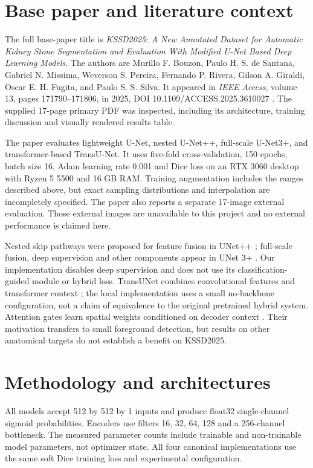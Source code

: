 \documentclass[a4paper,fleqn]{cas-sc}
\begin{document}
\section{Base paper and literature context}
The full base-paper title is \emph{KSSD2025: A New Annotated Dataset for Automatic Kidney Stone Segmentation and Evaluation With Modified U-Net Based Deep Learning Models}. The authors are Murillo F. Bouzon, Paulo H. S. de Santana, Gabriel N. Missima, Weverson S. Pereira, Fernando P. Rivera, Gilson A. Giraldi, Oscar E. H. Fugita, and Paulo S. S. Silva. It appeared in \emph{IEEE Access}, volume 13, pages 171790--171806, in 2025, DOI 10.1109/ACCESS.2025.3610027 \cite{bouzon2025}. The supplied 17-page primary PDF was inspected, including its architecture, training discussion and visually rendered results table.

The paper evaluates lightweight U-Net, nested U-Net++, full-scale U-Net3+, and transformer-based TransU-Net. It uses five-fold cross-validation, 150 epochs, batch size 16, Adam learning rate 0.001 and Dice loss on an RTX 3060 desktop with Ryzen 5 5500 and 16 GB RAM. Training augmentation includes the ranges described above, but exact sampling distributions and interpolation are incompletely specified. The paper also reports a separate 17-image external evaluation. Those external images are unavailable to this project and no external performance is claimed here.

Nested skip pathways were proposed for feature fusion in UNet++ \cite{zhou2018}; full-scale fusion, deep supervision and other components appear in UNet 3+ \cite{huang2020}. Our implementation disables deep supervision and does not use its classification-guided module or hybrid loss. TransUNet combines convolutional features and transformer context \cite{chen2021}; the local implementation uses a small no-backbone configuration, not a claim of equivalence to the original pretrained hybrid system. Attention gates learn spatial weights conditioned on decoder context \cite{oktay2018}. Their motivation transfers to small foreground detection, but results on other anatomical targets do not establish a benefit on KSSD2025.

\section{Methodology and architectures}
\label{sec:models}
All models accept 512 by 512 by 1 inputs and produce float32 single-channel sigmoid probabilities. Encoders use filters 16, 32, 64, 128 and a 256-channel bottleneck. The measured parameter counts include trainable and non-trainable model parameters, not optimizer state. All four canonical implementations use the same soft Dice training loss and experimental configuration.

\end{document}
